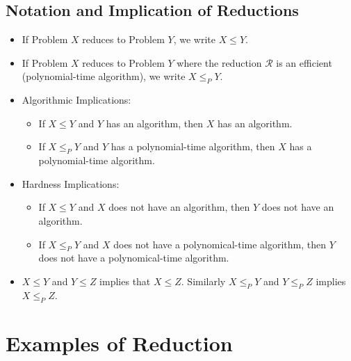 \subsection{Notation and Implication of Reductions}
\begin{itemize}
    \item If Problem $X$ reduces to Problem $Y$, we write $X \leq Y$.
    \item If Problem $X$ reduces to Problem $Y$ where the reduction $\mathcal{R}$ is an efficient (polynomial-time algorithm), we write $X \leq_P Y$.
    \item Algorithmic Implications:
    \begin{itemize}
        \item If $X \leq Y$ and $Y$ has an algorithm, then $X$ has an algorithm.
        \item If $X \leq_P Y$ and $Y$ has a polynomial-time algorithm, then $X$ has a polynomial-time algorithm.
    \end{itemize}
    \item Hardness Implications:
    \begin{itemize}
        \item If $X \leq Y$ and $X$ does not have an algorithm, then $Y$ does not have an algorithm.
        \item If $X \leq_P Y$ and $X$ does not have a polynomical-time algorithm, then $Y$ does not have a polynomical-time algorithm.
    \end{itemize}
    \item $X \leq Y$ and $Y \leq Z$ implies that $X \leq Z$. Similarly $X \leq_P Y$ and $Y \leq_P Z$ implies $X \leq_P Z$.
\end{itemize}

\section{Examples of Reduction}

